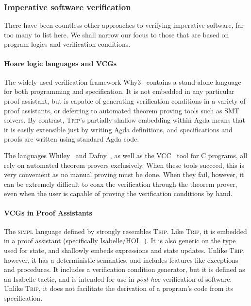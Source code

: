 \documentclass[sigplan]{acmart}%
\begin{document}
\subsubsection{Imperative software verification}
There have been countless other approaches to verifying imperative software, far
too many to list here. We shall narrow our focus to those that are
based on program logics and verification conditions.

\paragraph{Hoare logic languages and VCGs}
The widely-used verification framework Why3~\citep{why3} contains a stand-alone language for both 
programming and specification. It is not embedded 
in any particular proof assistant, but is capable of generating verification 
conditions in a variety of proof assistants, or deferring to automated 
theorem proving tools such as SMT solvers. By contrast, \textsc{Trip}'s 
partially shallow embedding within Agda means that it is easily extensible 
just by writing Agda definitions, and specifications and proofs are written 
using standard Agda code.

The languages Whiley~\citep{whiley} and Dafny~\citep{dafny}, as well as the VCC~\citep{vcc}
tool for C programs, all rely on automated theorem provers exclusively.
When these tools succeed, this is very convenient as no manual proving must be done.
When they fail, however, it can be extremely difficult to coax the verification 
through the theorem prover, even when the user is capable of proving the
verification conditions by hand. 


\paragraph{VCGs in Proof Assistants}
The \textsc{simpl} language defined by \citet{simpl} strongly resembles \textsc{Trip}. Like 
\textsc{Trip}, it is embedded in a proof assistant (specifically Isabelle/HOL~\citep{isabelle}).
It is also generic on the type used for state, and shallowly 
embeds expressions and state updates. Unlike \textsc{Trip}, however, it has a 
deterministic semantics, and includes features like exceptions and procedures.
It includes a verification condition generator, but it is defined as an Isabelle
tactic, and is intended for use in \emph{post-hoc} verification of software. Unlike 
\textsc{Trip}, it does not facilitate the derivation of a program's code from its specification.
\end{document}
